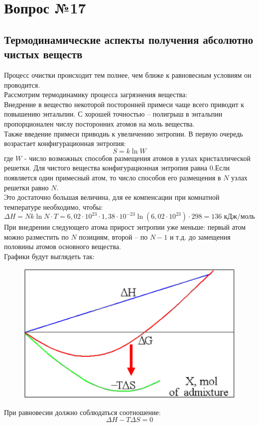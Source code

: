 \documentclass[14pt,a4paper]{scrartcl}
\begin{document}
\section*{Вопрос №17}
\subsection*{Термодинамические аспекты получения абсолютно чистых веществ}
Процесс очистки происходит тем полнее, чем ближе к равновесным условиям он проводится. \\
Рассмотрим термодинамику процесса загрязнения вещества: \\
Внедрение в вещество некоторой посторонней примеси чаще всего приводит к повышению энтальпии. С хорошей точностью -- полигрыш в энтальпии пропорционален числу посторонних атомов на моль вещества. \\
Также введение примеси приводиь к увеличению энтропии. В первую очередь возрастает конфигурационная энтропия:
$$ S = k \ln W $$
где $W$ - число возможных способов размещения атомов в узлах кристаллической решетки. Для чистого вещества конфигурационная энтропия равна $0$.Если появляется один примесный атом, то число способов его размещения в $N$ узлах решетки равно $N$.\\
Это достаточно большая величина, для ее компенсации при комнатной температуре необходимо, чтобы:
$$ \Delta{H} = Nk\ln{N} \cdot T = 6,02\cdot 10^{23} \cdot 1,38 \cdot 10^{-23} \ln{(6,02\cdot 10^{23})} \cdot 298 = 136 \text{ кДж/моль}$$  
При внедрении следующего атома прирост энтропии уже меньше: первый атом можно разместить по $N$ позициям, второй -- по $N-1$ и т.д. до замещения половины атомов основного вещества. \\
Графики будут выглядеть так:
\begin{figure}[H]
	\centering
	\includegraphics[scale=0.4]{purification}
	\caption{}
	\label{}
\end{figure}
При равновесии должно соблюдаться соотношение:
$$\Delta{H} - T\Delta{S} = 0 $$
\end{document}
